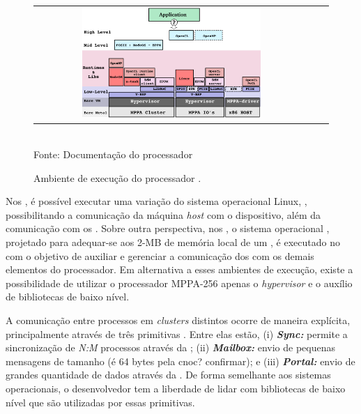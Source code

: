 \documentclass[
	12pt,				%
	openright,			%
	twoside,			%
	a4paper,			%
	english,			%
	brazil,				%
	]{abntex2}
\begin{document}
        \begin{figure}[t]
        	\begin{center}
            	\caption{Ambiente de execução do processador \mppa.}
                   \label{figruntime}
        		\begin{tabular}{ccc}
        			\includegraphics[width=0.67\textwidth]{figs/software_stack.png} \\
        		\end{tabular}
                \vspace{1ex} \\
                Fonte: Documentação do processador \mppa
            \end{center}
           \vspace{-2ex}
        \end{figure}
        
        Nos \ioclusters, é possível executar uma variação do sistema operacional Linux, \rtems, possibilitando a comunicação da máquina \textit{host} com o dispositivo, além da comunicação com os \cpclusters.
        Sobre outra perspectiva, nos \cpclusters, o sistema operacional \nodeos, projetado para adequar-se aos 2-MB de memória local de um \cpcluster, é executado no \rman com o objetivo de auxiliar e gerenciar a comunicação dos \pe com os demais elementos do processador.
        Em alternativa a esses ambientes de execução, existe a possibilidade de utilizar o processador MPPA-256 apenas o \textit{hypervisor} e o auxílio de bibliotecas de baixo nível.
        
        A comunicação entre processos em \textit{clusters} distintos ocorre de maneira explícita, principalmente  através de três primitivas \ipc.
        Entre elas estão,
        (i) \textbf{\textit{Sync:}} permite a sincronização de \textit{N:M} processos através da \cnoc;
        (ii) \textbf{\textit{Mailbox:}} envio de pequenas mensagens de tamanho (é 64 bytes pela cnoc? confirmar); e
        (iii) \textbf{\textit{Portal:}} envio de grandes quantidade de dados através da \dnoc.
        De forma semelhante aos sistemas operacionais, o desenvolvedor tem a liberdade de lidar com bibliotecas de baixo nível que são utilizadas por essas primitivas.
    
\end{document}
